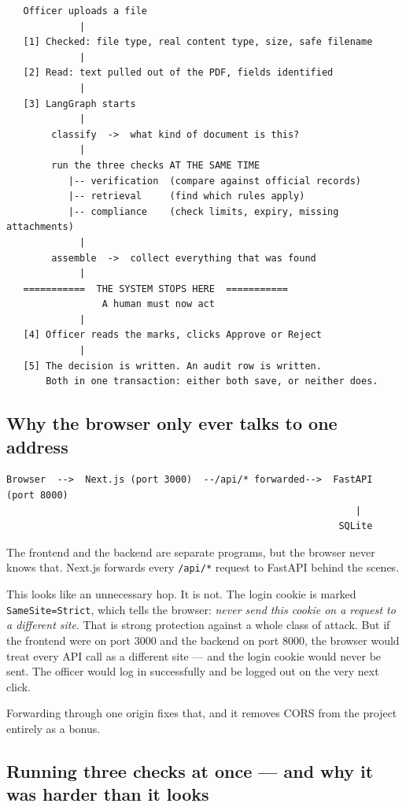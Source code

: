 \documentclass[11pt,a4paper]{article}
\begin{document}
\begin{lstlisting}
   Officer uploads a file
             |
   [1] Checked: file type, real content type, size, safe filename
             |
   [2] Read: text pulled out of the PDF, fields identified
             |
   [3] LangGraph starts
             |
        classify  ->  what kind of document is this?
             |
        run the three checks AT THE SAME TIME
           |-- verification  (compare against official records)
           |-- retrieval     (find which rules apply)
           |-- compliance    (check limits, expiry, missing attachments)
             |
        assemble  ->  collect everything that was found
             |
   ===========  THE SYSTEM STOPS HERE  ===========
                 A human must now act
             |
   [4] Officer reads the marks, clicks Approve or Reject
             |
   [5] The decision is written. An audit row is written.
       Both in one transaction: either both save, or neither does.
\end{lstlisting}

\subsection{Why the browser only ever talks to one address}

\begin{lstlisting}
Browser  -->  Next.js (port 3000)  --/api/* forwarded-->  FastAPI (port 8000)
                                                              |
                                                           SQLite
\end{lstlisting}

The frontend and the backend are separate programs, but the browser never knows
that. Next.js forwards every \texttt{/api/*} request to FastAPI behind the
scenes.

This looks like an unnecessary hop. It is not. The login cookie is marked
\texttt{SameSite=Strict}, which tells the browser: \emph{never send this cookie
on a request to a different site}. That is strong protection against a whole
class of attack. But if the frontend were on port 3000 and the backend on port
8000, the browser would treat every API call as a different site --- and the
login cookie would never be sent. The officer would log in successfully and be
logged out on the very next click.

Forwarding through one origin fixes that, and it removes CORS from the project
entirely as a bonus.

\subsection{Running three checks at once --- and why it was harder than it looks}
\end{document}
